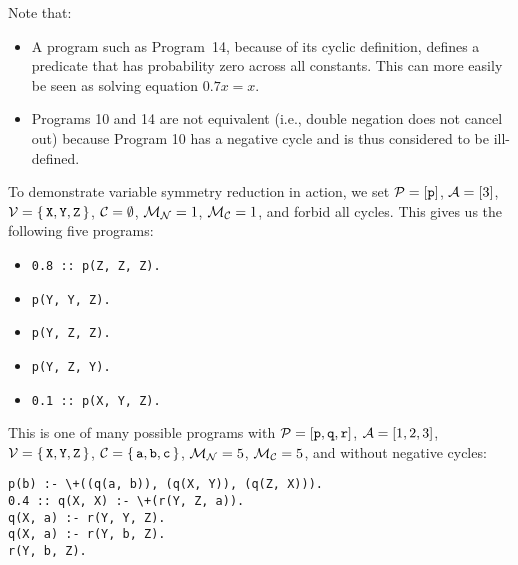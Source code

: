 Note that:
\begin{itemize}
  \item A program such as Program~14, because of its cyclic definition, defines
        a predicate that has probability zero across all constants. This can
        more easily be seen as solving equation $0.7x = x$.
  \item Programs 10 and 14 are not equivalent (i.e., double negation does not
        cancel out) because Program 10 has a negative cycle and is thus
        considered to be ill-defined.
\end{itemize}

To demonstrate variable symmetry reduction in action, we set
$\mathcal{P}{} = [\texttt{p}]$, $\mathcal{A}{} = [3]$,
$\mathcal{V}{} = \{\, \texttt{X}, \texttt{Y}, \texttt{Z} \,\}$,
$\mathcal{C}{} = \emptyset$, $\mathcal{M}_{\mathcal{N}}{} = 1$, $\mathcal{M}_{\mathcal{C}}{} = 1$, and
forbid all cycles. This gives us the following five programs:

\begin{itemize}
\item
\begin{verbatim}
0.8 :: p(Z, Z, Z).
\end{verbatim}
\item
\begin{verbatim}
p(Y, Y, Z).
\end{verbatim}
\item
\begin{verbatim}
p(Y, Z, Z).
\end{verbatim}
\item
\begin{verbatim}
p(Y, Z, Y).
\end{verbatim}
\item
\begin{verbatim}
0.1 :: p(X, Y, Z).
\end{verbatim}
\end{itemize}

This is one of many possible programs with
$\mathcal{P}{} = [\texttt{p}, \texttt{q}, \texttt{r}]$,
$\mathcal{A}{} = [1, 2, 3]$,
$\mathcal{V}{} = \{\, \texttt{X}, \texttt{Y}, \texttt{Z} \,\}$,
$\mathcal{C}{} = \{\, \texttt{a}, \texttt{b}, \texttt{c} \,\}$,
$\mathcal{M}_{\mathcal{N}}{} = 5$, $\mathcal{M}_{\mathcal{C}}{} = 5$, and without negative cycles:

\begin{verbatim}
p(b) :- \+((q(a, b)), (q(X, Y)), (q(Z, X))).
0.4 :: q(X, X) :- \+(r(Y, Z, a)).
q(X, a) :- r(Y, Y, Z).
q(X, a) :- r(Y, b, Z).
r(Y, b, Z).
\end{verbatim}

